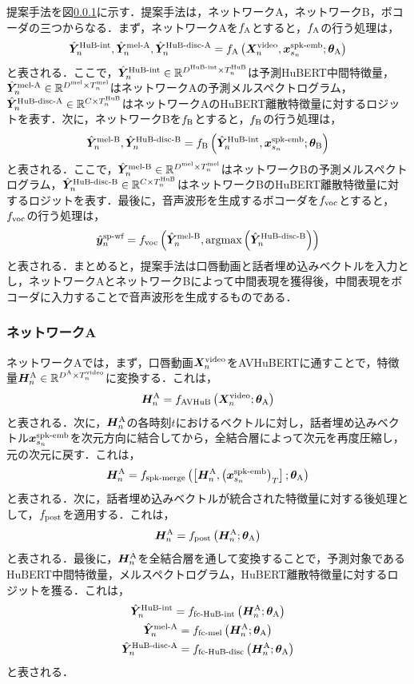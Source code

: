 \documentclass[12pt]{jarticle}
\numberwithin{equation}{section}    %
\numberwithin{figure}{section}      %
\numberwithin{table}{section}      %
\begin{document}
提案手法を図\ref{}に示す．提案手法は，ネットワークA，ネットワークB，ボコーダの三つからなる．まず，ネットワークAを$f_{\text{A}}$とすると，$f_{\text{A}}$の行う処理は，
\begin{equation}
    \label{sec4:eq:networkA_overview}
    \hubertIntPred, \melPredA, \hubertDiscPredA = \myNetworkA\lr{\video, \spkEmb; \weightA}
\end{equation}
と表される．ここで，$\hat{\bm{Y}}^{\text{HuB-int}}_{n} \in \mathbb{R}^{D^{\text{HuB-int}} \times T^{\text{HuB}}_{n}}$は予測HuBERT中間特徴量，$\hat{\bm{Y}}^{\text{mel-A}}_{n} \in \mathbb{R}^{D^{\text{mel}} \times T^{\text{mel}}_{n}}$はネットワークAの予測メルスペクトログラム，$\hat{\bm{Y}}^{\text{HuB-disc-A}}_{n} \in \mathbb{R}^{C \times T^{\text{HuB}}_{n}}$はネットワークAのHuBERT離散特徴量に対するロジットを表す．次に，ネットワークBを$f_{\text{B}}$とすると，$f_{\text{B}}$の行う処理は，
\begin{equation}
    \hat{\bm{Y}}^{\text{mel-B}}_{n}, \hat{\bm{Y}}^{\text{HuB-disc-B}}_{n} = f_{\text{B}}\left(\hat{\bm{Y}}^{\text{HuB-int}}_{n}, \bm{x}^{\text{spk-emb}}_{s_{n}}; \bm{\theta}_{\text{B}}\right)
\end{equation}
と表される．ここで，$\hat{\bm{Y}}^{\text{mel-B}}_{n} \in \mathbb{R}^{D^{\text{mel}} \times T^{\text{mel}}_{n}}$はネットワークBの予測メルスペクトログラム，$\hat{\bm{Y}}^{\text{HuB-disc-B}}_{n} \in \mathbb{R}^{C \times T^{\text{HuB}}_{n}}$はネットワークBのHuBERT離散特徴量に対するロジットを表す．最後に，音声波形を生成するボコーダを$f_{\text{voc}}$とすると，$f_{\text{voc}}$の行う処理は，
\begin{equation}
    \hat{\bm{y}}^{\text{sp-wf}}_{n} = f_{\text{voc}}\left(\hat{\bm{Y}}^{\text{mel-B}}_{n}, \text{argmax}\left(\hat{\bm{Y}}^{\text{HuB-disc-B}}_{n}\right)\right)
\end{equation}
と表される．まとめると，提案手法は口唇動画と話者埋め込みベクトルを入力とし，ネットワークAとネットワークBによって中間表現を獲得後，中間表現をボコーダに入力することで音声波形を生成するものである．

\subsubsection{ネットワークA}
ネットワークAでは，まず，口唇動画$\bm{X}^{\text{video}}_{n}$をAVHuBERTに通すことで，特徴量$\bm{H}^{\text{A}}_{n} \in \mathbb{R}^{D^{\text{A}} \times T^{\text{video}}_{n}}$に変換する．これは，
\begin{equation}
    \bm{H}^{\text{A}}_{n} = f_{\text{AVHuB}}\left(\bm{X}^{\text{video}}_{n}; \bm{\theta}_{\text{A}}\right)
\end{equation}
と表される．次に，$\bm{H}^{\text{A}}_{n}$の各時刻$t$におけるベクトルに対し，話者埋め込みベクトル$\bm{x}^{\text{spk-emb}}_{s_{n}}$を次元方向に結合してから，全結合層によって次元を再度圧縮し，元の次元に戻す．これは，
\begin{equation}
    \bm{H}^{\text{A}}_{n} = f_{\text{spk-merge}}\left(\left[\bm{H}^{\text{A}}_{n}, \left(\bm{x}^{\text{spk-emb}}_{s_{n}}\right)_{T}\right]; \bm{\theta}_{\text{A}}\right)
\end{equation}
と表される．次に，話者埋め込みベクトルが統合された特徴量に対する後処理として，$f_{\text{post}}$を適用する．これは，
\begin{equation}
    \bm{H}^{\text{A}}_{n} = f_{\text{post}}\left(\bm{H}^{\text{A}}_{n}; \bm{\theta}_{\text{A}}\right)
\end{equation}
と表される．最後に，$\bm{H}^{\text{A}}_{n}$を全結合層を通して変換することで，予測対象であるHuBERT中間特徴量，メルスペクトログラム，HuBERT離散特徴量に対するロジットを獲る．これは，
\begin{gather}
    \hat{\bm{Y}}^{\text{HuB-int}}_{n} = f_{\text{fc-HuB-int}}\left(\bm{H}^{\text{A}}_{n}; \bm{\theta}_{\text{A}}\right) \\
    \hat{\bm{Y}}^{\text{mel-A}}_{n} = f_{\text{fc-mel}}\left(\bm{H}^{\text{A}}_{n}; \bm{\theta}_{\text{A}}\right) \\
    \hat{\bm{Y}}^{\text{HuB-disc-A}}_{n} = f_{\text{fc-HuB-disc}}\left(\bm{H}^{\text{A}}_{n}; \bm{\theta}_{\text{A}}\right)
\end{gather}
と表される．
\end{document}
